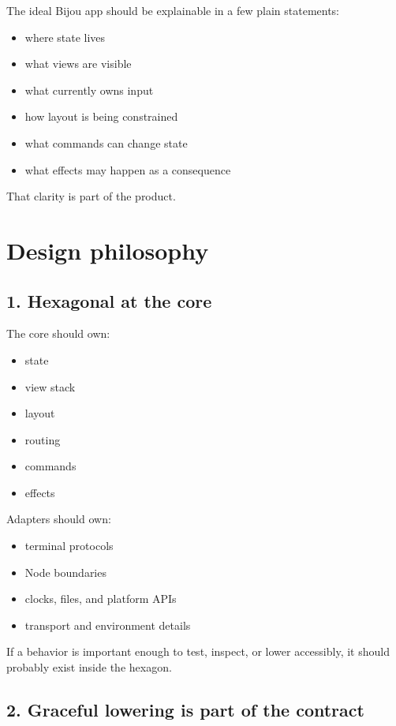 The ideal Bijou app should be explainable in a few plain statements:

\begin{itemize}
\tightlist
\item
  where state lives
\item
  what views are visible
\item
  what currently owns input
\item
  how layout is being constrained
\item
  what commands can change state
\item
  what effects may happen as a consequence
\end{itemize}

That clarity is part of the product.

\section{Design philosophy}\label{record-035-design-philosophy}

\subsection{1. Hexagonal at the core}\label{record-035-hexagonal-at-the-core}

The core should own:

\begin{itemize}
\tightlist
\item
  state
\item
  view stack
\item
  layout
\item
  routing
\item
  commands
\item
  effects
\end{itemize}

Adapters should own:

\begin{itemize}
\tightlist
\item
  terminal protocols
\item
  Node boundaries
\item
  clocks, files, and platform APIs
\item
  transport and environment details
\end{itemize}

If a behavior is important enough to test, inspect, or lower accessibly, it should probably exist inside the hexagon.

\subsection{2. Graceful lowering is part of the contract}\label{record-035-graceful-lowering-is-part-of-the-contract}

